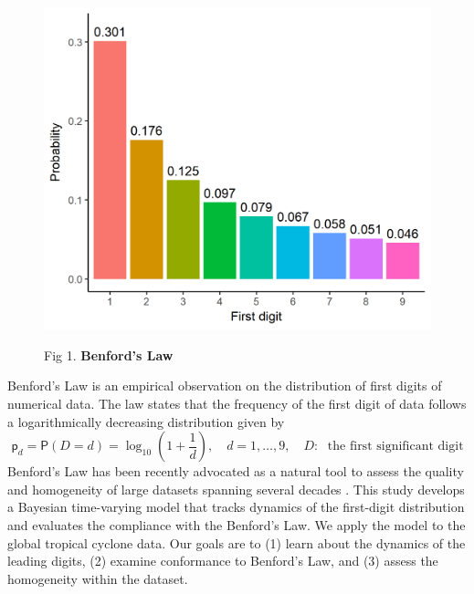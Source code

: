 \documentclass[a0paper,portrait]{baposter}
\begin{document}
\begin{poster}
{\begin{figure}
    \vspace{-10pt}
    \begin{center}
        \includegraphics[width=0.8\linewidth]{Benford}
        
    \scriptsize Fig 1. \textbf{Benford's Law}\\ 
    \end{center}
\end{figure}
Benford's Law is an empirical observation on the distribution of first digits of numerical data.  The law states that the frequency of the first digit of data follows a logarithmically decreasing distribution given by 
$$\textsf{p}_d=\textsf{P}(D=d)= \log_{10} \left(1+ \frac{1}{d}\right), \quad d=1,\ldots,9, \quad D: \;\text{ the first significant digit} $$
Benford's Law has been recently advocated as a natural tool to assess the quality and homogeneity of large datasets spanning several decades \cite{b_benford2}. 
This study develops a Bayesian time-varying model that tracks dynamics of the first-digit distribution and evaluates the compliance with the Benford's Law.   We apply the model to the global tropical cyclone data. Our goals are to (1) learn about the dynamics of the leading digits,  (2) examine conformance to Benford's Law, and  (3) assess the homogeneity within the dataset.


}

\end{poster}
\end{document}
